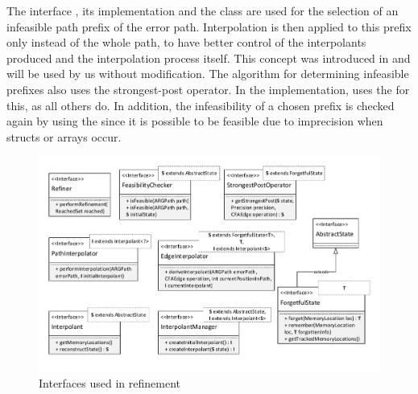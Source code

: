The interface , its implementation  and the class 
are used for the selection of an infeasible path prefix of the error path.
Interpolation is then applied to this prefix only instead of the whole path, to have better control of the interpolants produced and the interpolation process itself.
This concept was introduced in \cite{Beyer2015} and will be used by us without modification.
The algorithm for determining infeasible prefixes also uses the strongest-post operator. In the implementation,
 uses the  for this, as all others do.
In addition, the infeasibility of a chosen prefix is checked again by using the  since it is possible to be feasible due to imprecision when structs or arrays occur.

\begin{figure}
\includegraphics[width=\linewidth]{implementationCegar/RefinementInterfaces}
\caption{Interfaces used in refinement}
\label{fig:refInterfaces}
\end{figure}

